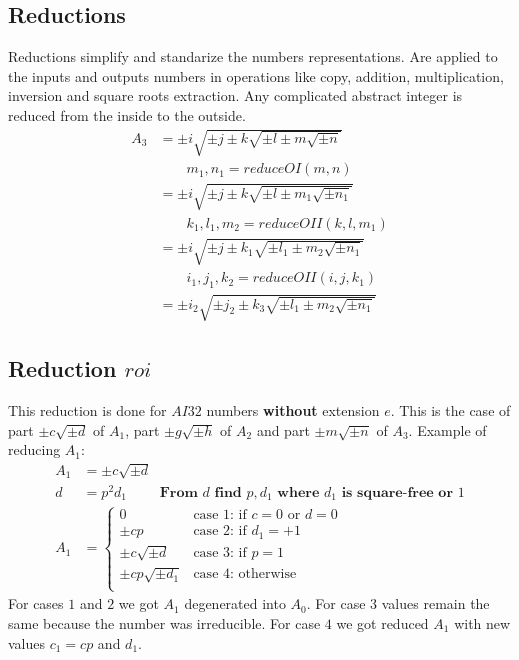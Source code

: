 \documentclass{article}
\begin{document}
\subsection{Reductions}
Reductions simplify and standarize the numbers representations. Are applied to the 
inputs and outputs numbers in operations like
copy, addition, multiplication, inversion and square roots extraction.
Any complicated abstract integer is reduced from the inside to the outside.
\begin{align}
A_3 &= \pm i\sqrt{\pm j \pm k\sqrt{\pm l \pm m\sqrt{\pm n}}}\\
 &\qquad m_1, n_1 = reduceOI(m, n) \nonumber\\
 &= \pm i\sqrt{\pm j \pm k\sqrt{\pm l \pm m_1\sqrt{\pm n_1}}}\\
 &\qquad k_1, l_1, m_2 = reduceOII(k, l, m_1) \nonumber\\
 &= \pm i\sqrt{\pm j \pm k_1\sqrt{\pm l_1 \pm m_2\sqrt{\pm n_1}}}\\
 &\qquad i_1, j_1, k_2 = reduceOII(i, j, k_1) \nonumber\\
 &= \pm i_2\sqrt{\pm j_2 \pm k_3\sqrt{\pm l_1 \pm m_2\sqrt{\pm n_1}}}
\end{align}

\subsection{Reduction $roi$}
This reduction is done for $AI32$ numbers \textbf{without} extension $e$. This is the case of
part $\pm c\sqrt{\pm d}$ of $A_1$,
part $\pm g\sqrt{\pm h}$ of $A_2$ and
part $\pm m\sqrt{\pm n}$ of $A_3$.
Example of reducing $A_1$:
\begin{align}
A_1 &= \pm c\sqrt{\pm d}\\
d   &= p^2d_1 \qquad \textbf{ From $d$ find $p,d_1$ where $d_1$ is square-free or $1$} \\
A_1 &= \begin{cases}
 0                    &\text{case 1: if } c = 0 \text{ or } d = 0\\
 \pm cp               &\text{case 2: if } d_1 = +1\\
 \pm c\sqrt{\pm d}    &\text{case 3: if } p = 1\\
 \pm cp\sqrt{\pm d_1} &\text{case 4: otherwise }\\
\end{cases}
\end{align}
For cases $1$ and $2$ we got $A_1$ degenerated into $A_0$.
For case $3$ values remain the same because the number was irreducible.
For case $4$ we got reduced $A_1$ with new values $c_1=cp$ and $d_1$.
\end{document}
